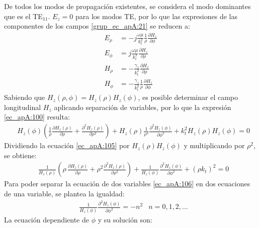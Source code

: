 De todos los modos de propagación existentes, se considera el modo dominantes que es el TE$_{11}$. $E_z = 0$ para los modos TE, por lo que las expresiones de las componentes de los campos \eqref{grup_ec_apA:21} se reducen a:
\begin{subequations}
\label{grup_ec_apA:23}
\begin{align}
E_{\rho} &= -j\frac{\omega\mu}{k^2_t}\frac{1}{\rho}\frac{\partial H_z}{\partial\phi}
\label{ec_apA:101}\\
E_{\phi} &= j\frac{\omega\mu}{k^2_t}\frac{\partial H_z}{\partial\rho}
\label{ec_apA:102}\\
H_{\rho} &= -\frac{\gamma_z}{k^2_t}\frac{\partial H_z}{\partial\rho}
\label{ec_apA:103}\\
H_{\phi} &= -\frac{\gamma_z}{k^2_t}\frac{1}{\rho}\frac{\partial H_z}{\partial\phi}
\label{ec_apA:104}
\end{align}
\end{subequations}
Sabiendo que $H_z\left(\rho ,\phi\right) = H_z\left(\rho\right)H_z\left(\phi\right)$, es posible determinar el campo longitudinal $H_z$ aplicando separación de variables, por lo que la expresión \eqref{ec_apA:100} resulta:
\begin{align}
&H_z\left(\phi\right)\left(\frac{1}{\rho}\frac{\partial H_z\left(\rho\right)}{\partial\rho} + \frac{\partial^2H_z\left(\rho\right)}{\partial\rho^2}\right) + H_z\left(\rho\right)\frac{1}{\rho^2}\frac{\partial^2H_z\left(\phi\right)}{\partial\phi^2} + k_t^2H_z\left(\rho\right)H_z\left(\phi\right) = 0
\label{ec_apA:105}
\end{align}
Dividiendo la ecuación \eqref{ec_apA:105} por $H_z\left(\rho\right)H_z\left(\phi\right)$ y multiplicando por $\rho^2$, se obtiene:
\begin{align}
&\frac{1}{H_z\left(\rho\right)}\left(\rho\,\frac{\partial H_z\left(\rho\right)}{\partial\rho} + \rho^2\frac{\partial^2H_z\left(\rho\right)}{\partial\rho^2}\right) + \frac{1}{H_z\left(\phi\right)}\frac{\partial^2H_z\left(\phi\right)}{\partial\phi^2} + \left(\rho k_t\right)^2 = 0
\label{ec_apA:106}
\end{align}
Para poder separar la ecuación de dos variables \eqref{ec_apA:106} en dos ecuaciones de una variable, se plantea la igualdad:
\begin{align}
&\frac{1}{H_z\left(\phi\right)}\frac{\partial^2H_z\left(\phi\right)}{\partial\phi^2} = - n^2 &n = 0, 1, 2, ...
\label{ec_apA:107}
\end{align}
La ecuación dependiente de $\phi$ y su solución son:
